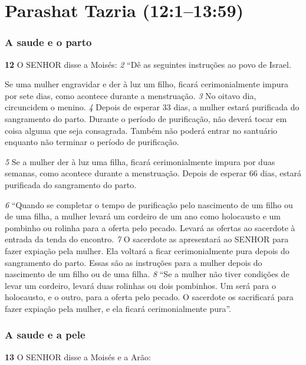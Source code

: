 \section*{Parashat Tazria (12:1–13:59)}

\subsubsection*{A saude e o parto}
   
\textbf{\large 12}
 O SENHOR disse a Moisés: 
\textit{\tiny 2} 
“Dê as seguintes instruções ao povo de Israel. 

\smallskip
Se uma mulher engravidar e der à luz um filho, ficará cerimonialmente impura por
sete dias, como acontece durante a menstruação. 
\textit{\tiny 3} 
No oitavo dia, circuncidem o
menino. 
\textit{\tiny 4} 
Depois de esperar 33 dias, a mulher estará purificada do sangramento
do parto. Durante o período de purificação, não deverá tocar em coisa alguma que
seja consagrada. Também não poderá entrar no santuário enquanto não terminar
o período de purificação. 

\smallskip
\textit{\tiny 5} 
Se a mulher der à luz uma filha, ficará
cerimonialmente impura por duas semanas, como acontece durante a
menstruação. Depois de esperar 66 dias, estará purificada do sangramento do parto. 

\smallskip
\textit{\tiny 6} 
“Quando se completar o tempo de purificação pelo nascimento de um filho ou
de uma filha, a mulher levará um cordeiro de um ano como holocausto e um
pombinho ou rolinha para a oferta pelo pecado. Levará as ofertas ao sacerdote à
entrada da tenda do encontro. 
\textit{\tiny 7} 
O sacerdote as apresentará ao SENHOR para fazer
expiação pela mulher. Ela voltará a ficar cerimonialmente pura depois do
sangramento do parto. Essas são as instruções para a mulher depois do
nascimento de um filho ou de uma filha. 
\textit{\tiny 8} 
“Se a mulher não tiver condições de levar um cordeiro, levará duas rolinhas ou
dois pombinhos. Um será para o holocausto, e o outro, para a oferta pelo pecado.
O sacerdote os sacrificará para fazer expiação pela mulher, e ela ficará
cerimonialmente pura”.

  
\bigskip 
\subsubsection*{A saude e a pele}
\textbf{\large 13}
 O SENHOR disse a Moisés e a Arão: 

